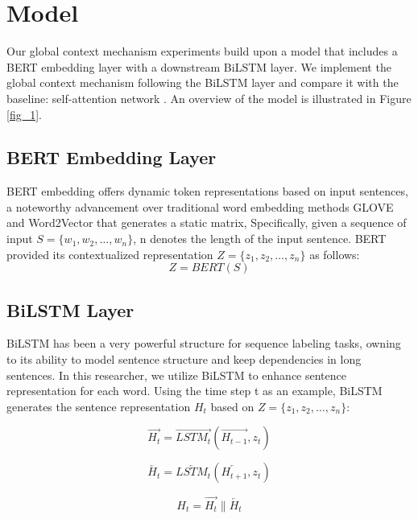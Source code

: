 \documentclass[lettersize,journal]{IEEEtran}
\begin{document}
\section{Model}
Our global context mechanism experiments build upon a model that includes a BERT embedding layer with a downstream BiLSTM layer. We implement the global context mechanism following the BiLSTM layer and compare it with the baseline: self-attention network \cite{Vaswani2017}. An overview of the model is illustrated in Figure \ref{fig_1}.

\subsection{BERT Embedding Layer}
BERT embedding offers dynamic token representations based on input sentences, a noteworthy advancement over traditional word embedding methods GLOVE \cite{Pennington2014} and Word2Vector \cite{Mikolov2013} that generates a static matrix, Specifically, given a sequence of input $S=\{w_1,w_2,…,w_n\}$, n denotes the length of the input sentence. BERT provided its contextualized representation $Z=\{z_1,z_2,…,z_n\}$ as follows:
\begin{equation}
Z = BERT(S)
\end{equation}

\subsection{BiLSTM Layer}
BiLSTM has been a very powerful structure for sequence labeling tasks, owning to its ability to model sentence structure and keep dependencies in long sentences. In this researcher, we utilize BiLSTM to enhance sentence representation for each word. Using the time step t as an example, BiLSTM generates the sentence representation $H_t$ based on $Z=\{z_1,z_2,…,z_n\}$:

\begin{equation}
\overrightarrow{H_t} = \overrightarrow{LSTM_t}(\overrightarrow{H_{t-1}},z_t)
\end{equation}

\begin{equation}
\overleftarrow{H_t} = \overleftarrow{LSTM_t}(\overleftarrow{H_{t+1}},z_t)
\end{equation}

\begin{equation}
H_t = \overrightarrow{H_t}\parallel\overleftarrow{H_t}
\end{equation}
\end{document}
